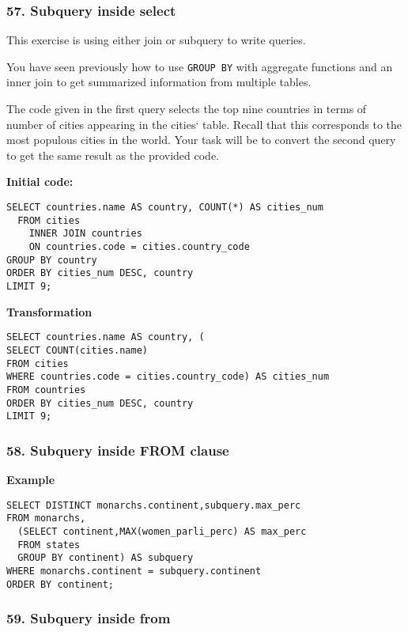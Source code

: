 \documentclass[
]{article}
\begin{document}
\hypertarget{subquery-inside-select}{%
\subsubsection{57. Subquery inside
select}\label{subquery-inside-select}}

This exercise is using either join or subquery to write queries.

You have seen previously how to use \texttt{GROUP\ BY} with aggregate
functions and an inner join to get summarized information from multiple
tables.

The code given in the first query selects the top nine countries in
terms of number of cities appearing in the cities` table. Recall that
this corresponds to the most populous cities in the world. Your task
will be to convert the second query to get the same result as the
provided code.

\textbf{Initial code:}

\begin{verbatim}
SELECT countries.name AS country, COUNT(*) AS cities_num
  FROM cities
    INNER JOIN countries
    ON countries.code = cities.country_code
GROUP BY country
ORDER BY cities_num DESC, country
LIMIT 9;
\end{verbatim}

\textbf{Transformation}

\begin{verbatim}
SELECT countries.name AS country, (
SELECT COUNT(cities.name)
FROM cities
WHERE countries.code = cities.country_code) AS cities_num
FROM countries
ORDER BY cities_num DESC, country
LIMIT 9;
\end{verbatim}

\hypertarget{subquery-inside-from-clause}{%
\subsubsection{58. Subquery inside FROM
clause}\label{subquery-inside-from-clause}}

\textbf{Example}

\begin{verbatim}
SELECT DISTINCT monarchs.continent,subquery.max_perc
FROM monarchs,
  (SELECT continent,MAX(women_parli_perc) AS max_perc
  FROM states
  GROUP BY continent) AS subquery
WHERE monarchs.continent = subquery.continent
ORDER BY continent;
\end{verbatim}

\hypertarget{subquery-inside-from}{%
\subsubsection{59. Subquery inside from}\label{subquery-inside-from}}
\end{document}
